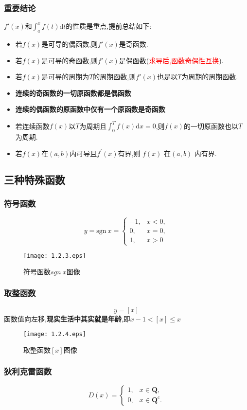 \documentclass[12pt, a4paper, oneside, UTF8]{ctexbook}  %
\begin{document}
\subsubsection{重要结论}
$f'(x)$和$\int_{a}^{x}f\left(t\right)\mathrm{d}t$的性质是重点,提前总结如下:

\begin{itemize}
    \item 若$f(x)$是可导的偶函数,则$f'(x)$是奇函数.
    \item 若$f(x)$是可导的奇函数,则$f'(x)$是偶函数(\textcolor{red}{求导后,函数奇偶性互换}).
    \item 若$f(x)$是可导的周期为$T$的周期函数,则$f'(x)$也是以$T$为周期的周期函数.
    \item \textbf{连续的奇函数的一切原函数都是偶函数}
    \item \textbf{连续的偶函数的原函数中仅有一个原函数是奇函数}
    \item 若连续函数$f(x)$以$T$为周期且$\int_{0}^{T}f(x)\mathrm{d}x=0$,则$f(x)$的一切原函数也以$T$为周期.
    \item 若$f(x)$在$(a,b)$内可导且$f^{\prime}(x) $有界,则 $f(x)$ 在$(a,b)$ 内有界.
\end{itemize}
\subsection{三种特殊函数}
\subsubsection{符号函数}
$$
    y=\text{sgn} \ x=\begin{cases}-1,&x<0,\\0,&x=0,\\1,&x>0\end{cases}
$$
\begin{figure}[H]
    \centering \texttt{[image: 1.2.3.eps]} \caption{符号函数$sgn \ x$图像}
\end{figure}
\subsubsection{取整函数}
$$
    y=[x]
$$
函数值向左移,\textbf{现实生活中其实就是年龄},即$x-1<[x] \leq x$
\begin{figure}[H]
    \centering \texttt{[image: 1.2.4.eps]} \caption{取整函数$[x]$图像}
\end{figure}

\subsubsection{狄利克雷函数}
$$
    D\left(x\right)=\left\{\begin{matrix}{1,}&x\in\mathbf{Q},\\{0,}&x\in\mathbf{Q}^{c}.\end{matrix}\right.
$$
\end{document}
